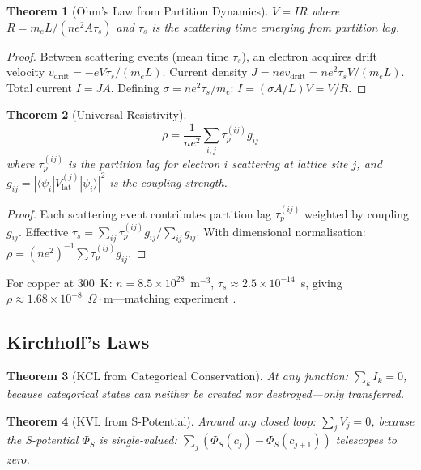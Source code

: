 \documentclass[11pt,twocolumn,a4paper]{article}
\newtheorem{theorem}{Theorem}[section]
\theoremstyle{definition}
\theoremstyle{remark}
\newcommand{\taup}{\tau_p}
\newcommand{\Spotential}{\Phi_S}
\begin{document}
\begin{theorem}[Ohm's Law from Partition Dynamics]
\label{thm:ohm}
$V = IR$ where $R = m_e L/(ne^2 A \tau_s)$ and $\tau_s$ is the scattering time emerging from partition lag.
\end{theorem}

\begin{proof}
Between scattering events (mean time $\tau_s$), an electron acquires drift velocity $v_{\mathrm{drift}} = -eV\tau_s/(m_e L)$. Current density $J = nev_{\mathrm{drift}} = ne^2\tau_s V/(m_e L)$. Total current $I = JA$. Defining $\sigma = ne^2\tau_s/m_e$: $I = (\sigma A/L)V = V/R$.
\end{proof}

\begin{theorem}[Universal Resistivity]
\label{thm:resistivity}
\begin{equation}
\rho = \frac{1}{ne^2}\sum_{i,j}\taup^{(ij)} g_{ij}
\end{equation}
where $\taup^{(ij)}$ is the partition lag for electron $i$ scattering at lattice site $j$, and $g_{ij} = |\langle\psi_i|V_{\mathrm{lat}}^{(j)}|\psi_i\rangle|^2$ is the coupling strength.
\end{theorem}

\begin{proof}
Each scattering event contributes partition lag $\taup^{(ij)}$ weighted by coupling $g_{ij}$. Effective $\tau_s = \sum_{ij}\taup^{(ij)}g_{ij}/\sum_{ij}g_{ij}$. With dimensional normalisation: $\rho = (ne^2)^{-1}\sum\taup^{(ij)}g_{ij}$.
\end{proof}

For copper at 300~K: $n = 8.5\times 10^{28}$~m$^{-3}$, $\tau_s \approx 2.5\times 10^{-14}$~s, giving $\rho \approx 1.68\times 10^{-8}$~$\Omega\cdot$m---matching experiment \citep{haynes2016}.

\subsection{Kirchhoff's Laws}

\begin{theorem}[KCL from Categorical Conservation]
At any junction: $\sum_k I_k = 0$, because categorical states can neither be created nor destroyed---only transferred.
\end{theorem}

\begin{theorem}[KVL from S-Potential]
Around any closed loop: $\sum_j V_j = 0$, because the S-potential $\Spotential$ is single-valued: $\sum_j (\Spotential(c_j) - \Spotential(c_{j+1}))$ telescopes to zero.
\end{theorem}
\end{document}
